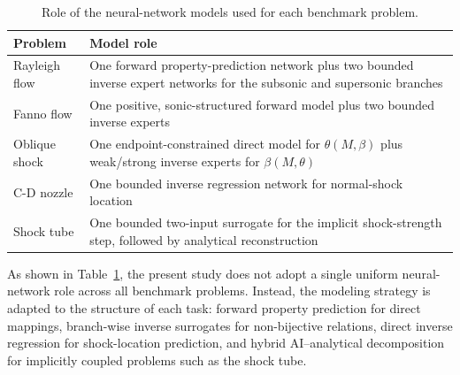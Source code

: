 \documentclass[preprint,12pt]{elsarticle}
\begin{document}
\begin{table}[t]
\centering
\caption{Role of the neural-network models used for each benchmark problem.}
\label{tab:model_roles}
\renewcommand{\arraystretch}{1.2}
\begin{tabular}{p{3.1cm} p{8.2cm}}
\toprule
\textbf{Problem} & \textbf{Model role} \\
\midrule
Rayleigh flow & One forward property-prediction network plus two bounded inverse expert networks for the subsonic and supersonic branches \\
Fanno flow & One positive, sonic-structured forward model plus two bounded inverse experts \\
Oblique shock & One endpoint-constrained direct model for $\theta(M,\beta)$ plus weak/strong inverse experts for $\beta(M,\theta)$ \\
C-D nozzle & One bounded inverse regression network for normal-shock location \\
Shock tube & One bounded two-input surrogate for the implicit shock-strength step, followed by analytical reconstruction \\
\bottomrule
\end{tabular}
\end{table}

As shown in Table~\ref{tab:model_roles}, the present study does not adopt a single uniform neural-network role across all benchmark problems. Instead, the modeling strategy is adapted to the structure of each task: forward property prediction for direct mappings, branch-wise inverse surrogates for non-bijective relations, direct inverse regression for shock-location prediction, and hybrid AI--analytical decomposition for implicitly coupled problems such as the shock tube.
\end{document}
